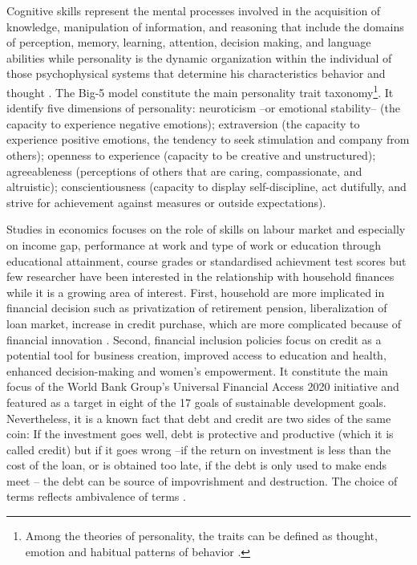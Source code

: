 \documentclass[a4paper, 11pt, onecolumn]{article}
\begin{document}
Cognitive skills represent the mental processes involved in the acquisition of knowledge, manipulation of information, and reasoning that include the domains of perception, memory, learning, attention, decision making, and language abilities \citep{Kiely2014} while personality is the dynamic organization within the individual of those psychophysical systems that determine his characteristics behavior and thought \citep{Allport1961}.
The Big-5 model constitute the main personality trait taxonomy\footnote{Among the theories of personality, the traits can be defined as thought, emotion and habitual patterns of behavior \citep{Kassin2003}.}.
It identify five dimensions of personality: neuroticism --or emotional stability-- (the capacity to experience negative emotions); extraversion (the capacity to experience positive emotions, the tendency to seek stimulation and company from others); openness to experience (capacity to be creative and unstructured); agreeableness (perceptions of others that are caring, compassionate, and altruistic); conscientiousness (capacity to display self-discipline, act dutifully, and strive for achievement against measures or outside expectations).	

Studies in economics focuses on the role of skills on labour market and especially on income gap, performance at work and type of work or education through educational attainment, course grades or standardised achievment test scores but few researcher have been interested in the relationship with household finances while it is a growing area of interest.%
First, household are more implicated in financial decision such as privatization of retirement pension, liberalization of loan market, increase in credit purchase, which are more complicated because of financial innovation \citep{Guiso2013}.
Second, financial inclusion policies focus on credit as a potential tool for business creation, improved access to education and health, enhanced decision-making and women’s empowerment. 
It constitute the main focus of the World Bank Group's Universal Financial Access 2020 initiative and featured as a target in eight of the 17 goals of sustainable development goals.
Nevertheless, it is a known fact that debt and credit are two sides of the same coin:
If the investment goes well, debt is protective and productive (which it is called credit) but if it goes wrong --if the return on investment is less than the cost of the loan, or is obtained too late, if the debt is only used to make ends meet \citep{Guerin2021}-- the debt can be source of impovrishment and destruction.
The choice of terms reflects ambivalence of terms \citep{Peebles2010}.
\end{document}
